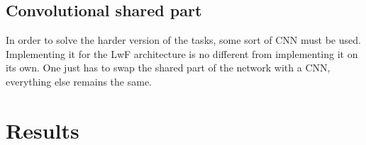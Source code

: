 \documentclass[a4paper,twocolumn]{article}
\begin{document}
\subsection{Convolutional shared part}
In order to solve the harder version of the tasks, some sort of CNN must be
used. Implementing it for the LwF architecture is no different from implementing
it on its own. One just has to swap the shared part of the network with a CNN,
everything else remains the same.

\section{Results}
\end{document}
